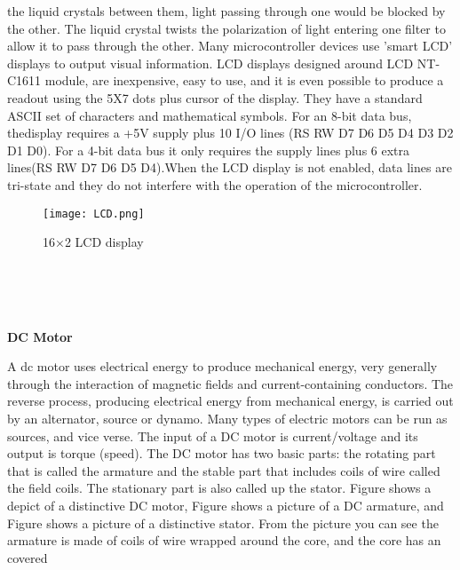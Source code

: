 \documentclass[a4paper,12pt, English]{article}
\begin{document}
\begin{normalsize}
the liquid crystals between them, light passing through one would be blocked by the other. The
liquid crystal twists the polarization of light entering one filter to allow it to pass through the
other.
\newline
Many microcontroller devices use 'smart LCD' displays to output visual information.
LCD displays designed around LCD NT-C1611 module, are inexpensive, easy to use, and it
is even possible to produce a readout using the 5X7 dots plus cursor of the display. They have
a standard ASCII set of characters and mathematical symbols. For an 8-bit data bus, thedisplay
requires a +5V supply plus 10 I/O lines (RS RW D7 D6 D5 D4 D3 D2 D1 D0). For a 4-bit
data bus it only requires the supply lines plus 6 extra lines(RS RW D7 D6 D5 D4).When the LCD display is not enabled, data lines are tri-state and they do not interfere with
the operation of the microcontroller.
\\
\begin{figure}[htb]
\begin{center}
\texttt{[image: LCD.png]}
\end{center}
\begin{center}
\renewcommand{\thefigure}{3. 2. 5}
\caption{\footnotesize 16×2 LCD display}
\end{center}
\end{figure}\\
\\
\\
\newline
\begin{large}
\textbf{DC Motor }
\end{large}
\newline
A dc motor uses electrical energy to produce mechanical energy, very generally
through the interaction of magnetic fields and current-containing conductors. The reverse
process, producing electrical energy from mechanical energy, is carried out by an alternator,
source or dynamo. Many types of electric motors can be run as sources, and vice verse. The
input of a DC motor is current/voltage and its output is torque (speed).
The DC motor has two basic parts: the rotating part that is called the armature and the
stable part that includes coils of wire called the field coils. The stationary part is also called
up the stator. Figure shows a depict of a distinctive DC motor, Figure shows a picture of a DC armature, and Figure shows a picture of a distinctive stator. From the picture you can see
the armature is made of coils of wire wrapped around the core, and the core has an covered

\end{normalsize}
\end{document}
